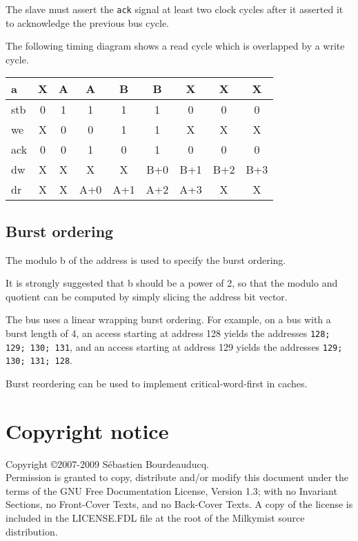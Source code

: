 \documentclass[a4paper,11pt]{article}
\begin{document}
The slave must assert the \verb!ack! signal at least two clock cycles after it asserted it to acknowledge the previous bus cycle.

The following timing diagram shows a read cycle which is overlapped by a write cycle.

\begin{tabular}{|l|c|c|c|c|c|c|c|c|}
\hline
a & X & A & A & B & B & X & X & X\\
\hline
stb & 0 & 1 & 1 & 1 & 1 & 0 & 0 & 0\\
\hline
we & X & 0 & 0 & 1 & 1 & X & X & X \\
\hline
ack & 0 & 0 & 1 & 0 & 1 & 0 & 0 & 0 \\
\hline
dw & X & X & X & X & B+0 & B+1 & B+2 & B+3 \\
\hline
dr & X & X & A+0 & A+1 & A+2 & A+3 & X & X \\
\hline
\end{tabular}


\subsection{Burst ordering}
The modulo b of the address is used to specify the burst ordering.

It is strongly suggested that b should be a power of 2, so that the modulo and quotient can be computed by simply slicing the address bit vector.

The bus uses a linear wrapping burst ordering. For example, on a bus with a burst length of 4, an access starting at address 128 yields the addresses \verb!128; 129; 130; 131!, and an access starting at address 129 yields the addresses \verb!129; 130; 131; 128!.

Burst reordering can be used to implement critical-word-first in caches.

\section*{Copyright notice}
Copyright \copyright 2007-2009 S\'ebastien Bourdeauducq. \\
Permission is granted to copy, distribute and/or modify this document under the terms of the GNU Free Documentation License, Version 1.3; with no Invariant Sections, no Front-Cover Texts, and no Back-Cover Texts. A copy of the license is included in the LICENSE.FDL file at the root of the Milkymist source distribution.
\end{document}
